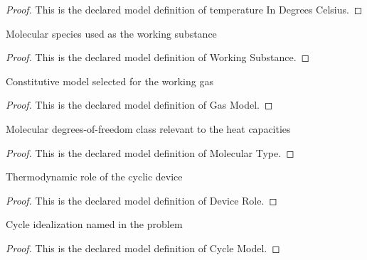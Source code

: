 \begin{proof}
  This is the declared model definition of temperature In Degrees Celsius.
\end{proof}
\begin{definition}
  \label{def:physics:phyx-mini-0481:phyxminiproblems-problemphyxmini0481-workingsubstance}
  Molecular species used as the working substance
\end{definition}
\begin{proof}
  This is the declared model definition of Working Substance.
\end{proof}
\begin{definition}
  \label{def:physics:phyx-mini-0481:phyxminiproblems-problemphyxmini0481-gasmodel}
  Constitutive model selected for the working gas
\end{definition}
\begin{proof}
  This is the declared model definition of Gas Model.
\end{proof}
\begin{definition}
  \label{def:physics:phyx-mini-0481:phyxminiproblems-problemphyxmini0481-moleculartype}
  Molecular degrees-of-freedom class relevant to the heat capacities
\end{definition}
\begin{proof}
  This is the declared model definition of Molecular Type.
\end{proof}
\begin{definition}
  \label{def:physics:phyx-mini-0481:phyxminiproblems-problemphyxmini0481-devicerole}
  Thermodynamic role of the cyclic device
\end{definition}
\begin{proof}
  This is the declared model definition of Device Role.
\end{proof}
\begin{definition}
  \label{def:physics:phyx-mini-0481:phyxminiproblems-problemphyxmini0481-cyclemodel}
  Cycle idealization named in the problem
\end{definition}
\begin{proof}
  This is the declared model definition of Cycle Model.
\end{proof}
